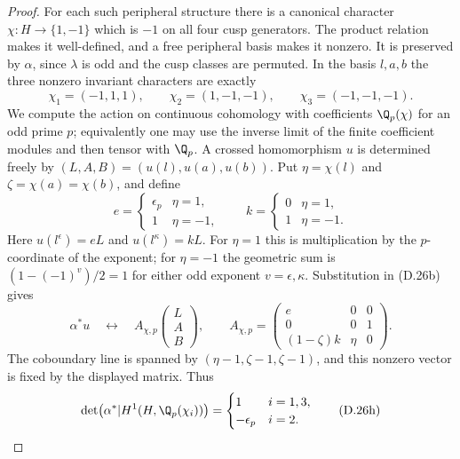\begin{proof}
For each such peripheral structure there is a canonical
character $\chi:H\to\{1,-1\}$ which is $-1$ on all
four cusp generators. The product relation makes it
well-defined, and a free peripheral basis makes it
nonzero. It is preserved by $\alpha$, since $\lambda$
is odd and the cusp classes are permuted. In the basis
$l,a,b$ the three nonzero invariant characters are exactly
\[
 \chi_1=(-1,1,1),\qquad
 \chi_2=(1,-1,-1),\qquad
 \chi_3=(-1,-1,-1).                               \tag{D.26f}
\]
We compute the action on continuous cohomology with
coefficients $\Q_p(\chi)$ for an odd prime $p$; equivalently
one may use the inverse limit of the finite coefficient
modules and then tensor with $\Q_p$. A crossed
homomorphism $u$ is determined freely by
$(L,A,B)=(u(l),u(a),u(b))$. Put
$\eta=\chi(l)$ and $\zeta=\chi(a)=\chi(b)$, and define
\[
 e=\begin{cases}\epsilon_p&\eta=1,\\1&\eta=-1,\end{cases}
 \qquad
 k=\begin{cases}0&\eta=1,\\1&\eta=-1.\end{cases}
\]
Here $u(l^\epsilon)=eL$ and $u(l^\kappa)=kL$.
For $\eta=1$ this is multiplication by the $p$-coordinate
of the exponent; for $\eta=-1$ the geometric sum is
$(1-(-1)^v)/2=1$ for either odd exponent
$v=\epsilon,\kappa$. Substitution in (D.26b) gives
\[
 \alpha^*u\quad\longleftrightarrow\quad
 A_{\chi,p}\begin{pmatrix}L\\A\\B\end{pmatrix},
 \qquad
 A_{\chi,p}=
 \begin{pmatrix}
 e&0&0\\0&0&1\\(1-\zeta)k&\eta&0
 \end{pmatrix}.                                 \tag{D.26g}
\]
The coboundary line is spanned by
$(\eta-1,\zeta-1,\zeta-1)$, and this nonzero vector
is fixed by the displayed matrix. Thus
\[
 \det\bigl(\alpha^*|H^1(H,\Q_p(\chi_i))\bigr)
 =\begin{cases}
 1&i=1,3,\\-\epsilon_p&i=2.
 \end{cases}                                    \tag{D.26h}
\]


\end{proof}
